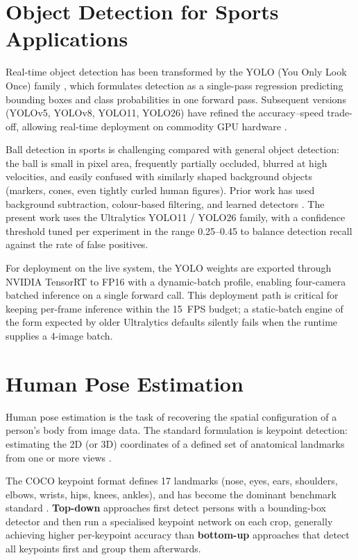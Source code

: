 \section{Object Detection for Sports Applications}

Real-time object detection has been transformed by the YOLO (You Only Look Once) family \cite{ref13}, which formulates detection as a single-pass regression predicting bounding boxes and class probabilities in one forward pass. Subsequent versions (YOLOv5, YOLOv8, YOLO11, YOLO26) have refined the accuracy--speed trade-off, allowing real-time deployment on commodity GPU hardware \cite{ref14}.

Ball detection in sports is challenging compared with general object detection: the ball is small in pixel area, frequently partially occluded, blurred at high velocities, and easily confused with similarly shaped background objects (markers, cones, even tightly curled human figures). Prior work has used background subtraction, colour-based filtering, and learned detectors \cite{ref5, ref6}. The present work uses the Ultralytics YOLO11 / YOLO26 family, with a confidence threshold tuned per experiment in the range 0.25--0.45 to balance detection recall against the rate of false positives.

For deployment on the live system, the YOLO weights are exported through NVIDIA TensorRT \cite{ref38_tensorrt} to FP16 with a dynamic-batch profile, enabling four-camera batched inference on a single forward call. This deployment path is critical for keeping per-frame inference within the 15~FPS budget; a static-batch engine of the form expected by older Ultralytics defaults silently fails when the runtime supplies a 4-image batch.

\section{Human Pose Estimation}

Human pose estimation is the task of recovering the spatial configuration of a person's body from image data. The standard formulation is keypoint detection: estimating the 2D (or 3D) coordinates of a defined set of anatomical landmarks from one or more views \cite{ref15, ref47_pose_review}.

The COCO keypoint format defines 17 landmarks (nose, eyes, ears, shoulders, elbows, wrists, hips, knees, ankles), and has become the dominant benchmark standard \cite{ref16}. \textbf{Top-down} approaches first detect persons with a bounding-box detector and then run a specialised keypoint network on each crop, generally achieving higher per-keypoint accuracy than \textbf{bottom-up} approaches that detect all keypoints first and group them afterwards.

